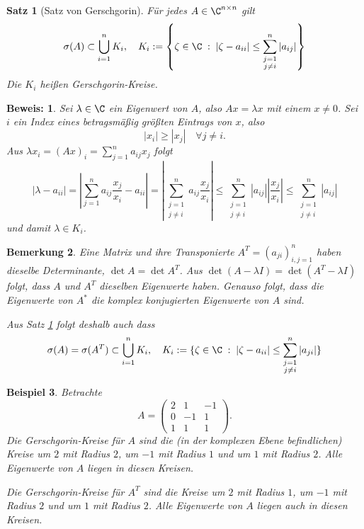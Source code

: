 \documentclass[
]{mycourse}
\theoremstyle{mythm}
\newtheorem{theorem}{Satz}[chapter]
\newtheorem{bemerkung}[theorem]{Bemerkung}
\newtheorem{beispiel}[theorem]{Beispiel}
\theoremstyle{break}
\newtheorem*{beweis}{Beweis:}
\newcommand{\dd}{\; : \;}    			      	%
\begin{document}
\begin{theorem}[Satz von Gerschgorin]\label{satz:gerschgorin}
Für jedes $A\in \C^{n\times n}$ gilt
\[
\sigma(A)\subset \bigcup_{i=1}^n K_i, \quad K_i:=\left\{ \zeta\in \C \dd |\zeta-a_{ii}|\leq \sum_{\substack{j=1\\ j\neq i}}^n |a_{ij}| \right\}
\]
Die $K_i$ heißen Gerschgorin-Kreise.
\end{theorem}
\begin{beweis}
Sei $\lambda\in \C$ ein Eigenwert von $A$, also $Ax=\lambda x$ mit einem $x\neq 0$. Sei $i$ ein Index eines betragsmäßig
größten Eintrags von $x$, also
\[
|x_i|\geq |x_j| \quad \forall j\neq i.
\]
Aus $\lambda x_i=(Ax)_i=\sum_{j=1}^n a_{ij}x_j$
folgt
\[
| \lambda - a_{ii}| = \left| \sum_{j=1}^n a_{ij} \frac{x_j}{x_i} - a_{ii}\right| 
= \left| \sum_{\substack{j=1\\ j\neq i}}^n a_{ij} \frac{x_j}{x_i}\right| 
\leq  \sum_{\substack{j=1\\ j\neq i}}^n |a_{ij}| \left|\frac{x_j}{x_i}\right|\leq \sum_{\substack{j=1\\ j\neq i}}^n |a_{ij}|
\]
und damit $\lambda\in K_i$.
\end{beweis}

\begin{bemerkung}\label{Bem:Transponiert}
Eine Matrix und ihre Transponierte $A^T=(a_{ji})_{i,j=1}^n$ haben dieselbe Determinante, $\det A=\det A^T$. 
Aus $\det (A-\lambda I)=\det(A^T-\lambda I)$ folgt, dass $A$ und $A^T$ dieselben Eigenwerte haben.
Genauso folgt, dass die Eigenwerte von $A^*$ die komplex konjugierten Eigenwerte von $A$ sind.

Aus Satz \ref{satz:gerschgorin} folgt deshalb auch dass 
\[
\sigma(A)=\sigma(A^T)\subset \bigcup_{i=1}^n K_i, \quad K_i:=\{ \zeta\in \C \dd |\zeta-a_{ii}|\leq \sum_{\substack{j=1\\ j\neq i}}^n |a_{ji}| \}
\]
\end{bemerkung}

\begin{beispiel}
Betrachte 
\[
A=\begin{pmatrix} 2 & 1 & -1\\ 0 & -1 & 1\\ 1 & 1 & 1\end{pmatrix}.
\]
Die Gerschgorin-Kreise für $A$ sind die (in der komplexen Ebene befindlichen) Kreise um $2$ mit Radius $2$, um $-1$ mit Radius $1$
und um $1$ mit Radius $2$. Alle Eigenwerte von $A$ liegen in diesen Kreisen.

Die Gerschgorin-Kreise für $A^T$ sind die Kreise um $2$ mit Radius $1$, um $-1$ mit Radius $2$
und um $1$ mit Radius $2$. Alle Eigenwerte von $A$ liegen auch in diesen Kreisen.
\end{beispiel}
\end{document}
